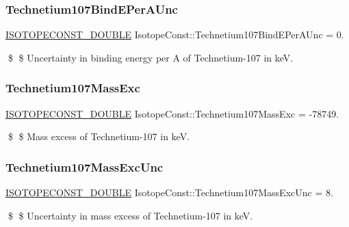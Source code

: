 \subsubsection{\texorpdfstring{Technetium107\+Bind\+E\+Per\+A\+Unc}{Technetium107BindEPerAUnc}}
{\footnotesize\ttfamily \mbox{\hyperlink{group___isotope_const-_macros_ga8f45a7272ce02c0b4c65c44636ed719a}{I\+S\+O\+T\+O\+P\+E\+C\+O\+N\+S\+T\+\_\+\+D\+O\+U\+B\+LE}} Isotope\+Const\+::\+Technetium107\+Bind\+E\+Per\+A\+Unc = 0.}

\$ \$ Uncertainty in binding energy per A of Technetium-\/107 in keV. \mbox{\label{group___isotope_const-_technetium-_tc107_gab2ed452792985989202680b33eb2c7af}} 
\subsubsection{\texorpdfstring{Technetium107\+Mass\+Exc}{Technetium107MassExc}}
{\footnotesize\ttfamily \mbox{\hyperlink{group___isotope_const-_macros_ga8f45a7272ce02c0b4c65c44636ed719a}{I\+S\+O\+T\+O\+P\+E\+C\+O\+N\+S\+T\+\_\+\+D\+O\+U\+B\+LE}} Isotope\+Const\+::\+Technetium107\+Mass\+Exc = -\/78749.}

\$ \$ Mass excess of Technetium-\/107 in keV. \mbox{\label{group___isotope_const-_technetium-_tc107_ga5310ff4dccf9121552dde94647cb2143}} 
\subsubsection{\texorpdfstring{Technetium107\+Mass\+Exc\+Unc}{Technetium107MassExcUnc}}
{\footnotesize\ttfamily \mbox{\hyperlink{group___isotope_const-_macros_ga8f45a7272ce02c0b4c65c44636ed719a}{I\+S\+O\+T\+O\+P\+E\+C\+O\+N\+S\+T\+\_\+\+D\+O\+U\+B\+LE}} Isotope\+Const\+::\+Technetium107\+Mass\+Exc\+Unc = 8.}

\$ \$ Uncertainty in mass excess of Technetium-\/107 in keV. \mbox{\label{group___isotope_const-_technetium-_tc107_ga93a81ba647ea4b8bd32982f420224c9c}} 
